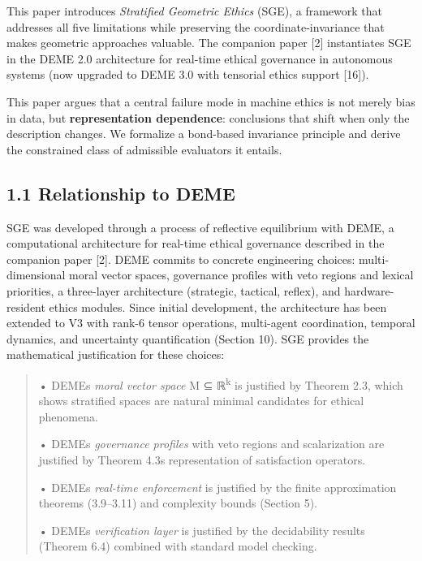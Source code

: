 \documentclass[12pt]{article}
\theoremstyle{plain}
\theoremstyle{definition}
\theoremstyle{remark}
\begin{document}
This paper introduces \emph{Stratified Geometric Ethics} (SGE), a
framework that addresses all five limitations while preserving the
coordinate-invariance that makes geometric approaches valuable. The
companion paper {[}2{]} instantiates SGE in the DEME 2.0 architecture
for real-time ethical governance in autonomous systems (now upgraded to DEME 3.0 with tensorial ethics support {[}16{]}).

This paper argues that a central failure mode in machine ethics is not
merely bias in data, but \textbf{representation dependence}: conclusions
that shift when only the description changes. We formalize a bond-based
invariance principle and derive the constrained class of admissible
evaluators it entails.

\subsection{1.1 Relationship to DEME}\label{relationship-to-deme}

SGE was developed through a process of reflective equilibrium with DEME,
a computational architecture for real-time ethical governance
described in the companion paper {[}2{]}. DEME commits to concrete
engineering choices: multi-dimensional moral vector spaces, governance
profiles with veto regions and lexical priorities, a three-layer
architecture (strategic, tactical, reflex), and hardware-resident ethics
modules. Since initial development, the architecture has been extended
to V3 with rank-6 tensor operations, multi-agent coordination, temporal
dynamics, and uncertainty quantification (Section 10). SGE provides the
mathematical justification for these choices:

\begin{quote}
• DEME\textquotesingle s \emph{moral vector space} M ⊆
ℝ\textsuperscript{k} is justified by Theorem 2.3, which shows stratified
spaces are natural minimal candidates for ethical phenomena.

• DEME\textquotesingle s \emph{governance profiles} with veto regions
and scalarization are justified by Theorem 4.3\textquotesingle s
representation of satisfaction operators.

• DEME\textquotesingle s \emph{real-time enforcement} is justified by
the finite approximation theorems (3.9--3.11) and complexity bounds
(Section 5).

• DEME\textquotesingle s \emph{verification layer} is justified by the
decidability results (Theorem 6.4) combined with standard model
checking.
\end{quote}
\end{document}
